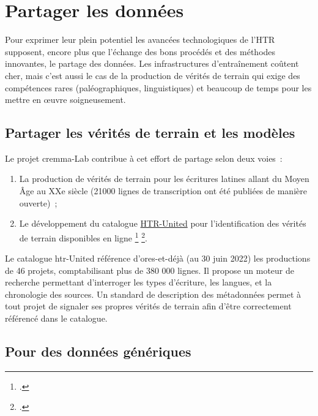 \documentclass[a4paper,12pt,twoside]{book}
\begin{document}
		\section{Partager les données}
		
			Pour exprimer leur plein potentiel les avancées technologiques de l'HTR
			supposent, encore plus que l'échange des bons procédés et des méthodes
			innovantes, le partage des données. Les infrastructures d'entraînement
			coûtent cher, mais c'est aussi le cas de la production de vérités de
			terrain qui exige des compétences rares (paléographiques, linguistiques)
			et beaucoup de temps pour les mettre en œuvre soigneusement.
			
			\subsection{Partager les vérités de terrain et les modèles}
			
				Le projet \gls{cremma}-Lab contribue à cet effort de partage selon deux voies~:
				
				\begin{enumerate}
					
					\item
					La production de vérités de terrain pour les écritures latines allant
					du Moyen Âge au XXe siècle (21000 lignes de transcription ont été
					publiées de manière ouverte)~;
					\item
					Le développement du catalogue
					\href{https://htr-united.github.io/catalog.html}{HTR-United} pour
					l'identification des vérités de terrain disponibles en ligne
					\footcite{campsCremmaLabProjectsTranscription2022}
					\footcite{chagueSharingHTRDatasets2022}.
				\end{enumerate}
				
				Le catalogue \gls{htr}-United référence d'ores-et-déjà (au 30 juin 2022) les
				productions de 46 projets, comptabilisant plus de 380 000 lignes. Il
				propose un moteur de recherche permettant d'interroger les types
				d'écriture, les langues, et la chronologie des sources. Un standard de
				description des métadonnées permet à tout projet de signaler ses propres
				vérités de terrain afin d'être correctement référencé dans le catalogue.
			
			\subsection{Pour des données génériques}
			
\end{document}
